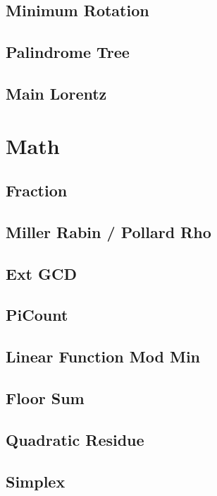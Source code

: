 \subsection{Minimum Rotation}

\subsection{Palindrome Tree}

\subsection{Main Lorentz}


\section{Math}
\subsection{Fraction}

\subsection{Miller Rabin / Pollard Rho}

\subsection{Ext GCD}

\subsection{PiCount}

\subsection{Linear Function Mod Min}

\subsection{Floor Sum}

\subsection{Quadratic Residue}

\subsection{Simplex}

